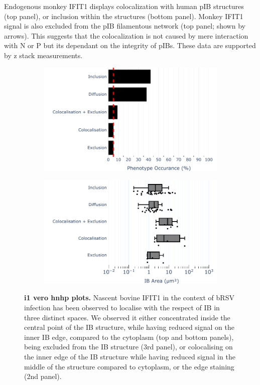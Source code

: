 Endogenous monkey IFIT1 displays colocalization with human pIB structures (top panel), or inclusion within the structures (bottom panel). Monkey IFIT1 signal is also excluded from the pIB filamentous network (top panel; shown by arrows). This suggests that the colocalization is not caused by mere interaction with N or P but its dependant on the integrity of pIBs. These data are supported by z stack measurements.  

\begin{figure}
    \begin{subfigure}{0.5\textwidth}
        \caption{}
        \includegraphics[width=1\linewidth]{09. Chapter 4/Figs/03. pIB/01. IFIT1/04. bar_i1_vero_hnhp.pdf} 
    \end{subfigure}
    \begin{subfigure}{0.5\textwidth}
        \caption{}
        \includegraphics[width=1\linewidth]{09. Chapter 4/Figs/03. pIB/01. IFIT1/05. box_i1_vero_hnhp.pdf}
    \end{subfigure}
    \caption[i1 vero hnhp plots]{\textbf{i1 vero hnhp plots.} Nascent bovine IFIT1 in the context of bRSV infection has been observed to localise with the respect of IB in three distinct spaces. We observed it either concentrated inside the central point of the IB structure, while having reduced signal on the inner IB edge, compared to the cytoplasm (top and bottom panels), being excluded from the IB structure (3rd panel), or colocalising on the inner edge of the IB structure while having reduced signal in the middle of the structure compared to cytoplasm, or the edge staining (2nd panel).}
    \label{fig:i1 vero hnhp plots}
\end{figure}

